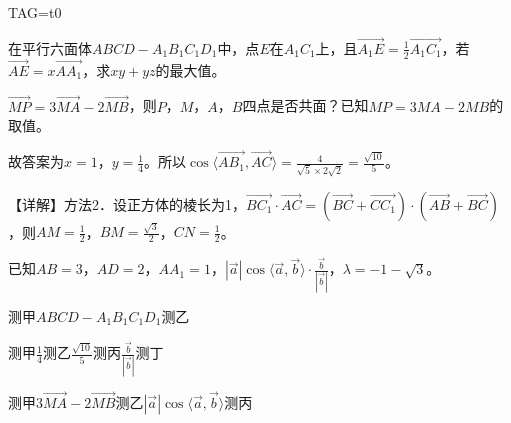 \documentclass[fontset=none]{ctexart}
\begin{document}
\noindent TAG=t0

\noindent 在平行六面体\(ABCD-A_1B_1C_1D_1\)中，点\(E\)在\(A_1C_1\)上，且\(\overrightarrow{A_1E}=\frac{1}{2}\overrightarrow{A_1C_1}\)，若\(\overrightarrow{AE}=x\overrightarrow{AA_1}\)，求\(xy+yz\)的最大值。

\noindent \(\overrightarrow{MP}=3\overrightarrow{MA}-2\overrightarrow{MB}\)，则\(P\)，\(M\)，\(A\)，\(B\)四点是否共面？已知\(MP=3MA-2MB\)的取值。

\noindent 故答案为\(x=1\)，\(y=\frac{1}{4}\)。所以\(\cos\langle \overrightarrow{AB_1},\overrightarrow{AC}\rangle=\frac{4}{\sqrt{5}\times2\sqrt{2}}=\frac{\sqrt{10}}{5}\)。

\noindent 【详解】方法2．设正方体的棱长为1，\(\overrightarrow{BC_{1}} \cdot \overrightarrow{AC} = ( \overrightarrow{BC} + \overrightarrow{CC_{1}} ) \cdot ( \overrightarrow{AB} + \overrightarrow{BC} )\)，则\(AM = \frac{1}{2}\)，\(BM = \frac{\sqrt{3}}{2}\)，\(CN = \frac{1}{2}\)。

\noindent 已知\(AB=3\)，\(AD=2\)，\(AA_1=1\)，\(| \overrightarrow{a} |\cos\langle \overrightarrow{a},\overrightarrow{b} \rangle \cdot \frac{\overrightarrow{b}}{| \overrightarrow{b} |}\)，\(\lambda=-1-\sqrt{3}\)。

\noindent 测甲\(ABCD-A_1B_1C_1D_1\)测乙

\noindent 测甲\(\frac{1}{4}\)测乙\(\frac{\sqrt{10}}{5}\)测丙\(\frac{\overrightarrow{b}}{| \overrightarrow{b} |}\)测丁

\noindent 测甲\(3\overrightarrow{MA}-2\overrightarrow{MB}\)测乙\(| \overrightarrow{a} |\cos\langle \overrightarrow{a},\overrightarrow{b} \rangle\)测丙
\end{document}
